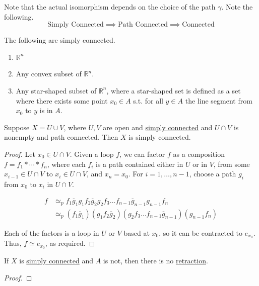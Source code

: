 	Note that the actual isomorphism depends on the choice of the path $\gamma$. Note the following. 
  \begin{equation}
    \text{Simply Connected} \implies \text{Path Connected} \implies \text{Connected}
  \end{equation}

  \begin{example}
    \label{ex:simply-connected-spaces}
    The following are simply connected. 
    \begin{enumerate}
      \item $\mathbb{R}^n$ 
      \item Any convex subset of $\mathbb{R}^n$.
      \item Any star-shaped subset of $\mathbb{R}^n$, where a star-shaped set is defined as a set where there exists some point $x_0 \in A$ s.t. for all $y \in A$ the line segment from $x_0$ to $y$ is in $A$.  
    \end{enumerate}
  \end{example}

  \begin{theorem}
    \label{thm:union-of-simply-connected-spaces}
    Suppose $X = U \cup V$, where $U, V$ are open and \hyperref[def:simply-connected]{simply connected} and $U \cap V$ is nonempty and path connected. Then $X$ is simply connected. 
  \end{theorem}
  \begin{proof}
    Let $x_0 \in U \cap V$. Given a loop $f$, we can factor $f$ as a composition $f = f_1 * \cdots * f_n$, where each $f_i$ is a path contained either in $U$ or in $V$, from some $x_{i-1} \in U \cap V$ to $x_i \in U \cap V$, and $x_n = x_0$. For $i = 1, \ldots, n-1$, choose a path $g_i$ from $x_0$ to $x_i$ in $U \cap V$.

    \begin{align}
      f &\simeq_p f_1 \overline{g}_1 g_1 f_2 \overline{g}_2 g_2 f_3 \ldots f_{n-1} \overline{g}_{n-1} g_{n-1} f_n\\
      &\simeq_p (f_1 \overline{g}_1)(g_1 f_2 \overline{g}_2)(g_2 f_3 \ldots f_{n-1} \overline{g}_{n-1})(g_{n-1} f_n)
    \end{align}

    Each of the factors is a loop in $U$ or $V$ based at $x_0$, so it can be contracted to $e_{x_0}$. Thus, $f \simeq e_{x_0}$, as required.
  \end{proof}

	\begin{theorem}
		\label{thm:no_retraction}
    If $X$ is \hyperref[def:simply-connected]{simply connected} and $A$ is not, then there is no \hyperref[def:retraction]{retraction}. 
  \end{theorem}
	\begin{proof}
	  
	\end{proof}

